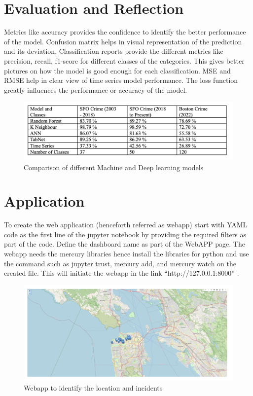 \documentclass[conference,final,]{IEEEtran}
\begin{document}
\section{Evaluation and Reflection}\label{evaluation-and-reflection}

Metrics like accuracy provides the confidence to identify the better performance
of the model. Confusion matrix helps in visual representation of the prediction
and its deviation. Classification reports provide the different metrics
like precision, recall, f1-score for different classes of the categories. This
gives better pictures on how the model is good enough for each
classification. MSE and RMSE help in clear view of time series model
performance. The loss function greatly influences the performance or
accuracy of the model.

\begin{figure}

{\centering \includegraphics[width=0.9\linewidth]{img/tab1} 

}

\caption{Comparison of different Machine and Deep learning models}\label{fig:unnamed-chunk-12}
\end{figure}

\section{Application}\label{application}

To create the web application (henceforth referred as webapp) start with
YAML code as the first line of the jupyter notebook by providing the
required filters as part of the code. Define the dashboard name as part
of the WebAPP page. The webapp needs the mercury libraries hence install
the libraries for python and use the command such as jupyter trust,
mercury add, and mercury watch on the created file. This will initiate
the webapp in the link ``http://127.0.0.1:8000'' .

\begin{figure}

{\centering \includegraphics[width=0.5\linewidth]{img/fig14a} 

}

\caption{Webapp to identify the location and incidents}\label{fig:unnamed-chunk-13}
\end{figure}
\end{document}
